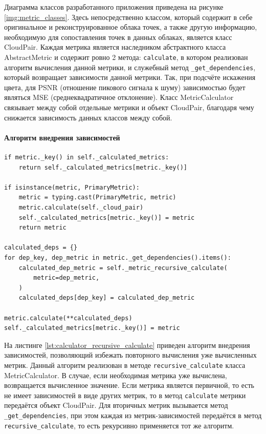 \documentclass[a4paper,12pt]{extreport}
\begin{document}
Диаграмма классов разработанного приложения приведена на рисунке
\ref{img:metric_classes}. Здесь непосредственно классом, который содержит в себе
оригинальное и реконструированное облака точек, а также другую информацию,
необходимую для сопоставления точек в данных облаках, является класс CloudPair.
Каждая метрика является наследником абстрактного класса AbstractMetric и
содержит ровно 2 метода: \texttt{calculate}, в котором реализован алгоритм
вычисления данной метрики, и служебный метод \texttt{\_get\_dependencies},
который возвращает зависимости данной метрики. Так, при подсчёте искажения
цвета, для PSNR (отношение пикового сигнала к шуму) зависимостью будет являться
MSE (среднеквадратичное отклонение). Класс MetricCalculator связывает между
собой отдельные метрики и объект CloudPair, благодаря чему снижается зависимость
данных классов между собой.

\paragraph{Алгоритм внедрения зависимостей}

\begin{lstlisting}[caption={
    Алгоритм подсчёта метрик.
}, label={lst:calculator_recursive_calculate}]
if metric._key() in self._calculated_metrics:
    return self._calculated_metrics[metric._key()]

if isinstance(metric, PrimaryMetric):
    metric = typing.cast(PrimaryMetric, metric)
    metric.calculate(self._cloud_pair)
    self._calculated_metrics[metric._key()] = metric
    return metric

calculated_deps = {}
for dep_key, dep_metric in metric._get_dependencies().items():
    calculated_dep_metric = self._metric_recursive_calculate(
        metric=dep_metric,
    )
    calculated_deps[dep_key] = calculated_dep_metric

metric.calculate(**calculated_deps)
self._calculated_metrics[metric._key()] = metric
\end{lstlisting}

На листинге \ref{lst:calculator_recursive_calculate} приведен алгоритм внедрения
зависимостей, позволяющий избежать повторного вычисления уже вычисленных метрик.
Данный алгоритм реализован в методе \texttt{recursive\_calculate} класса
MetricCalculator. В случае, если необходимая метрика уже вычислена, возвращается
вычисленное значение. Если метрика является первичной, то есть не имеет
зависимостей в виде других метрик, то в метод \texttt{calculate} метрики
передаётся объект CloudPair. Для вторичных метрик вызывается метод
\texttt{\_get\_dependencies}, при этом каждая из метрик-зависимостей передаётся
в метод \texttt{recursive\_calculate}, то есть рекурсивно применяется тот же
алгоритм.
\end{document}
